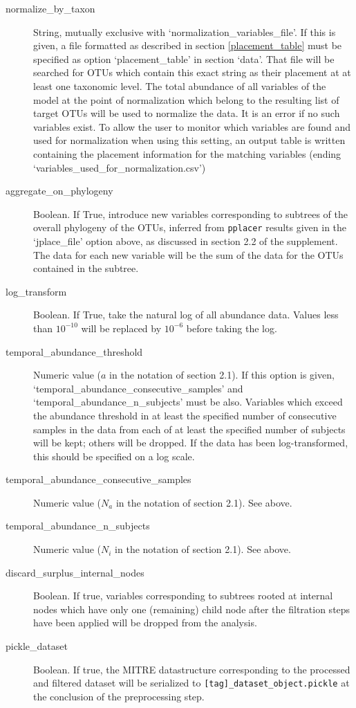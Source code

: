 \documentclass[12pt]{report}
\begin{document}
\begin{description}
\item[normalize\_by\_taxon] String, mutually exclusive with
  `normalization\_variables\_file'. If this is given, a file formatted
  as described in section \ref{placement_table} must be specified as
  option `placement\_table' in section `data'.  That file will be
  searched for OTUs which contain this exact string as their placement
  at at least one taxonomic level. The total abundance of all
  variables of the model at the point of normalization which belong to
  the resulting list of target OTUs will be used to normalize the
  data. It is an error if no such variables exist. To allow the user
  to monitor which variables are found and used for normalization when
  using this setting, an output table is written containing the
  placement information for the matching variables (ending
  `variables\_used\_for\_normalization.csv')

\item[aggregate\_on\_phylogeny] Boolean. If True, introduce new
  variables corresponding to subtrees of the overall phylogeny of the
  OTUs, inferred from \texttt{pplacer} results given in the
  `jplace\_file' option above, as discussed in section 2.2 of the
  supplement. The data for each new variable will be the sum of the data
  for the OTUs contained in the subtree.
\item[log\_transform] Boolean. If True, take the natural log of all
  abundance data. Values less than $10^{-10}$ will be replaced by
  $10^{-6}$ before taking the log.
\item[temporal\_abundance\_threshold] Numeric value ($a$ in the
  notation of section 2.1).  If this option is given,
  `temporal\_abundance\_consecutive\_samples' and
  `temporal\_abundance\_n\_subjects' must be also. Variables which
  exceed the abundance threshold in at least the specified number of
  consecutive samples in the data from each of at least the specified
  number of subjects will be kept; others will be dropped. If the data
  has been log-transformed, this should be specified on a log scale.
\item[temporal\_abundance\_consecutive\_samples] Numeric value ($N_a$
  in the notation of section 2.1). See above.
\item[temporal\_abundance\_n\_subjects] Numeric value ($N_i$ in the
  notation of section 2.1). See above.
\item[discard\_surplus\_internal\_nodes] Boolean. If true,
  variables corresponding to subtrees rooted at internal nodes which
  have only one (remaining) child node after the filtration steps
  have been applied will be dropped from the analysis.
\item[pickle\_dataset] Boolean. If true, the MITRE datastructure
  corresponding to the processed and filtered dataset will be
  serialized to \texttt{[tag]\_dataset\_object.pickle} at the
  conclusion of the preprocessing step.
\end{description}
\end{document}
